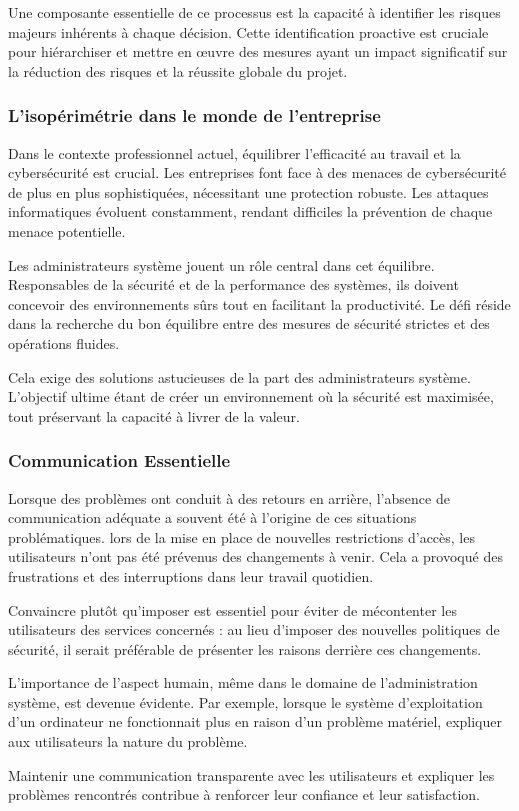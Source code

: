 Une composante essentielle de ce processus est la capacité à identifier les risques majeurs inhérents à chaque décision.
Cette identification proactive est cruciale pour hiérarchiser et mettre en œuvre des mesures ayant un impact significatif sur la réduction des risques et la réussite globale du projet.

\subsubsection{L'isopérimétrie dans le monde de l'entreprise}
Dans le contexte professionnel actuel, équilibrer l'efficacité au travail et la cybersécurité est crucial.
Les entreprises font face à des menaces de cybersécurité de plus en plus sophistiquées, nécessitant une protection robuste.
Les attaques informatiques évoluent constamment, rendant difficiles la prévention de chaque menace potentielle.

Les administrateurs système jouent un rôle central dans cet équilibre.
Responsables de la sécurité et de la performance des systèmes, ils doivent concevoir des environnements sûrs tout en facilitant la productivité.
Le défi réside dans la recherche du bon équilibre entre des mesures de sécurité strictes et des opérations fluides.

Cela exige des solutions astucieuses de la part des administrateurs système.
L'objectif ultime étant de créer un environnement où la sécurité est maximisée, tout préservant la capacité à livrer de la valeur.

\subsubsection{Communication Essentielle}
Lorsque des problèmes ont conduit à des retours en arrière, l'absence de communication adéquate a souvent été à l'origine de ces situations problématiques.
lors de la mise en place de nouvelles restrictions d'accès, les utilisateurs n'ont pas été prévenus des changements à venir.
Cela a provoqué des frustrations et des interruptions dans leur travail quotidien.

Convaincre plutôt qu'imposer est essentiel pour éviter de mécontenter les utilisateurs des services concernés : au lieu d'imposer des nouvelles politiques de sécurité, il serait préférable de présenter les raisons derrière ces changements.

L'importance de l'aspect humain, même dans le domaine de l'administration système, est devenue évidente.
Par exemple, lorsque le système d'exploitation d'un ordinateur ne fonctionnait plus en raison d'un problème matériel, expliquer aux utilisateurs la nature du problème.

Maintenir une communication transparente avec les utilisateurs et expliquer les problèmes rencontrés contribue à renforcer leur confiance et leur satisfaction.